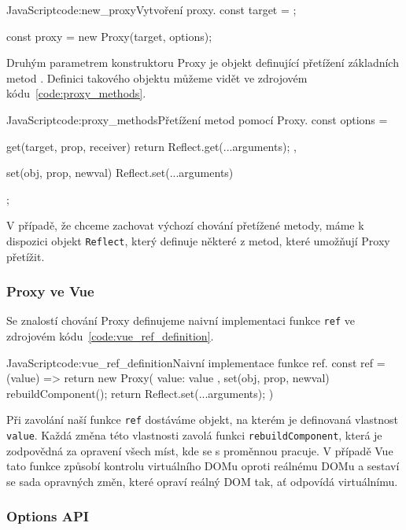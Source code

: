 \documentclass[
  master,
  program=ainf,
  tables=false,
  sourcecodes,
  glossaries,
  index
]{kidiplom}
\begin{document}
\begin{kicode}{JavaScript}{code:new_proxy}{Vytvoření proxy.}
  const target = {};

  const proxy = new Proxy(target, options);
\end{kicode}

Druhým parametrem konstruktoru Proxy je objekt definující přetížení základních metod \cite{default_methods}. 
Definici takového objektu můžeme vidět ve zdrojovém kódu~\ref{code:proxy_methods}.

\begin{kicode}{JavaScript}{code:proxy_methods}{Přetížení metod pomocí Proxy.}
  const options = {
    get(target, prop, receiver) {
      return Reflect.get(...arguments);
    },

    set(obj, prop, newval) {
      Reflect.set(...arguments)
    }
  };
\end{kicode}

V případě, že chceme zachovat výchozí chování přetížené metody, máme k dispozici objekt
{\tt Reflect}, který definuje některé z metod, které umožňují Proxy přetížit.


\subsubsection{Proxy ve Vue}

Se znalostí chování Proxy definujeme naivní implementaci funkce {\tt ref} ve zdrojovém kódu~\ref{code:vue_ref_definition}. 

\begin{kicode}{JavaScript}{code:vue_ref_definition}{Naivní implementace funkce ref.}
  const ref = (value) => {
    return new Proxy({ value: value }, {
      set(obj, prop, newval) {
        rebuildComponent();
        return Reflect.set(...arguments);
      }
    })
  }
\end{kicode}

Při zavolání naší funkce {\tt ref} dostáváme objekt, na kterém je definovaná vlastnost {\tt value}. 
Každá změna této vlastnosti zavolá funkci {\tt rebuildComponent}, která je zodpovědná za
opravení všech míst, kde se s proměnnou pracuje. V případě Vue \cite{vue} tato funkce způsobí
kontrolu virtuálního DOMu oproti reálnému DOMu a sestaví se sada opravných změn, které
opraví reálný DOM tak, ať odpovídá virtuálnímu.

\subsubsection{Options API}
\end{document}

